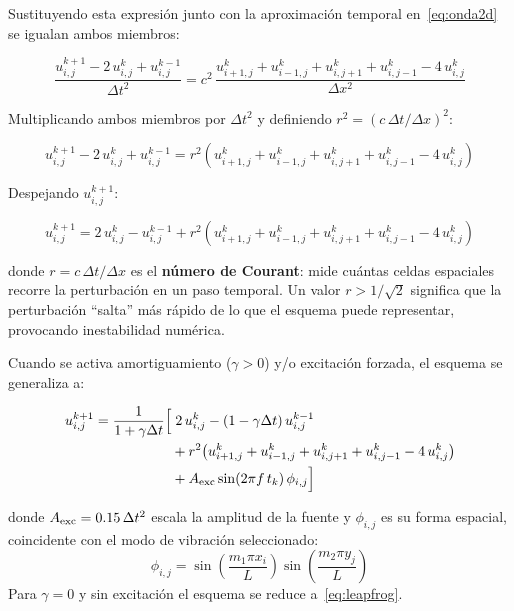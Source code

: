 \documentclass[12pt, a4paper]{article}
\begin{document}
Sustituyendo esta expresión junto con la aproximación temporal en~\eqref{eq:onda2d}
se igualan ambos miembros:

\begin{equation}
    \frac{u^{k+1}_{i,j} - 2\,u^k_{i,j} + u^{k-1}_{i,j}}{\Delta t^2}
    = c^2\,
    \frac{u^k_{i+1,j} + u^k_{i-1,j} + u^k_{i,j+1} + u^k_{i,j-1} - 4\,u^k_{i,j}}
         {\Delta x^2}
\end{equation}

Multiplicando ambos miembros por $\Delta t^2$ y definiendo $r^2 = (c\,\Delta t/\Delta x)^2$:

\begin{equation}
    u^{k+1}_{i,j} - 2\,u^k_{i,j} + u^{k-1}_{i,j}
    = r^2\!\left(u^k_{i+1,j} + u^k_{i-1,j} + u^k_{i,j+1} + u^k_{i,j-1}
    - 4\,u^k_{i,j}\right)
\end{equation}

Despejando $u^{k+1}_{i,j}$:

\begin{equation}
    u^{k+1}_{i,j} = 2\,u^k_{i,j} - u^{k-1}_{i,j}
    + r^2\!\left(u^k_{i+1,j} + u^k_{i-1,j} + u^k_{i,j+1} + u^k_{i,j-1}
    - 4\,u^k_{i,j}\right)
    \label{eq:leapfrog}
\end{equation}

donde $r = c\,\Delta t / \Delta x$ es el \textbf{número de Courant}: mide cuántas
celdas espaciales recorre la perturbación en un paso temporal. Un valor $r > 1/\sqrt{2}$
significa que la perturbación ``salta'' más rápido de lo que el esquema puede
representar, provocando inestabilidad numérica.

Cuando se activa amortiguamiento ($\gamma > 0$) y/o excitación forzada, el esquema se
generaliza a:

\begin{equation}
\begin{split}
    u^{k+1}_{i,j} = \frac{1}{1+\gamma\Delta t}\Bigl[
    &\;2\,u^k_{i,j} - (1-\gamma\Delta t)\,u^{k-1}_{i,j} \\
    &+ r^2\!\left(u^k_{i+1,j}+u^k_{i-1,j}+u^k_{i,j+1}+u^k_{i,j-1}
       -4\,u^k_{i,j}\right) \\
    &+ A_{\rm exc}\sin(2\pi f\,t_k)\,\phi_{i,j}\Bigr]
\end{split}
    \label{eq:leapfrog-amort}
\end{equation}

donde $A_{\rm exc} = 0.15\,\Delta t^2$ escala la amplitud de la fuente y $\phi_{i,j}$
es su forma espacial, coincidente con el modo de vibración seleccionado:
\[
    \phi_{i,j} = \sin\!\left(\frac{m_1\pi x_i}{L}\right)\sin\!\left(\frac{m_2\pi y_j}{L}\right)
\]
Para $\gamma = 0$ y sin excitación el esquema se reduce a~\eqref{eq:leapfrog}.
\end{document}
